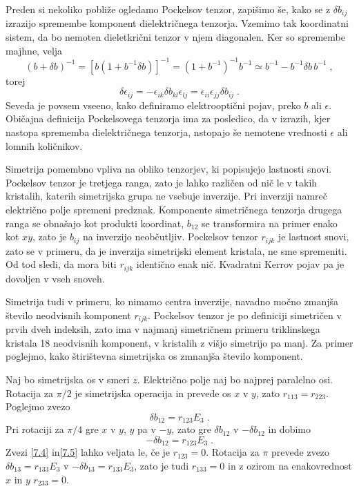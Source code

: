 Preden si nekoliko pobliže ogledamo Pockelsov tenzor, zapišimo še,
kako se z $\delta b_{ij}$ izrazijo spremembe komponent dielektričnega
tenzorja. Vzemimo tak koordinatni sistem, da bo nemoten dieletkrični
tenzor v njem diagonalen. Ker so spremembe majhne, velja 
\begin{equation}
(b+\delta b)^{-1}=[b(1+b^{-1}\delta b)]^{-1}=(1+b^{-1})^{-1}b^{-1}\simeq b^{-1}-b^{-1}\delta b\, b^{-1}\;,\label{7.2}
\end{equation}
 torej 
\begin{equation}
\delta\epsilon_{ij}=-\epsilon_{ik}\delta b_{kl}\epsilon_{lj}=\epsilon_{ii}\epsilon_{jj}\delta b_{ij}\;.\label{7.3}
\end{equation}
 Seveda je povsem vseeno, kako definiramo elektrooptični pojav, preko
$b$ ali $\epsilon$. Običajna definicija Pockelsovega tenzorja ima
za posledico, da v izrazih, kjer nastopa sprememba dielektričnega
tenzorja, nstopajo še nemotene vrednosti $\epsilon$ ali lomnih količnikov.

Simetrija pomembno vpliva na obliko tenzorjev, ki popisujejo lastnosti
snovi. Pockelsov tenzor je tretjega ranga, zato je lahko različen
od nič le v takih kristalih, katerih simetrijska grupa ne vsebuje
inverzije. Pri inverziji namreč električno polje spremeni predznak.
Komponente simetričnega tenzorja drugega ranga se obnašajo kot produkti
koordinat, $b_{12}$ se transformira na primer enako kot $xy$, zato
je $b_{ij}$ na inverzijo neobčutljiv. Pockelsov tenzor $r_{ijk}$
je lastnost snovi, zato se v primeru, da je inverzija simetrijski
element kristala, ne sme spremeniti. Od tod sledi, da mora biti $r_{ijk}$
identično enak nič. Kvadratni Kerrov pojav pa je dovoljen v vseh snoveh.

Simetrija tudi v primeru, ko nimamo centra inverzije, navadno močno
zmanjša število neodvisnih komponent $r_{ijk}$. Pockelsov tenzor
je po definiciji simetričen v prvih dveh indeksih, zato ima v najmanj
simetričnem primeru triklinskega kristala 18 neodvisnih komponent,
v kristalih z višjo simetrijo pa manj. Za primer poglejmo, kako štirištevna
simetrijska os zmnanjša število komponent.

Naj bo simetrijska os v smeri $z$. Električno polje naj bo najprej
paralelno osi. Rotacija za $\pi/2$ je simetrijska operacija in prevede
os $x$ v $y$, zato $r_{113}=r_{223}$. Poglejmo zvezo 
\begin{equation}
\delta b_{12}=r_{123}E_{3}\;.\label{7.4}
\end{equation}
 Pri rotaciji za $\pi/4$ gre $x$ v $y$, $y$ pa v $-y$, zato gre
$\delta b_{12}$ v $-\delta b_{12}$ in dobimo 
\begin{equation}
-\delta b_{12}=r_{123}E_{3}\;.\label{7.5}
\end{equation}
 Zvezi \ref{7.4} in\ref{7.5} lahko veljata le, če je $r_{123}=0$.
Rotacija za $\pi$ prevede zvezo $\delta b_{13}=r_{133}E_{3}$ v $-\delta b_{13}=r_{133}E_{3}$,
zato je tudi $r_{133}=0$ in z ozirom na enakovrednost $x$ in $y$
$r_{233}=0$.

